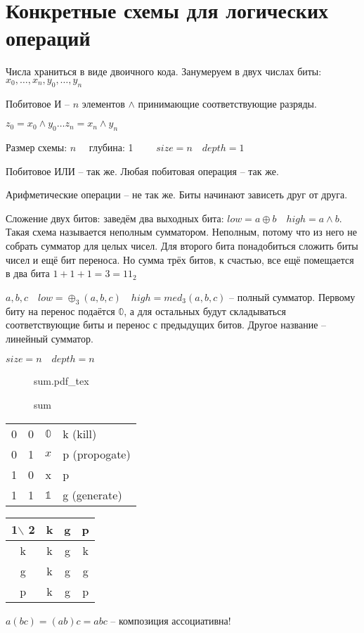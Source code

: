 \documentclass{book}
\theoremstyle{definition}
\newcommand{\incfig}[1]{%
    \def\svgwidth{\columnwidth}
    {#1.pdf_tex}
}
\begin{document}
\section{Конкретные схемы для логических операций}

Числа храниться в виде двоичного кода. Занумеруем в двух числах биты: $x_0, \ldots, x_{n}, y_0, \ldots, y_{n} $

Побитовое И -- $n$ элементов  $\land$ принимающие соответствующие разряды.

$z_0 = x_0\land y_0 \ldots z_n = x_{n} \land y_{n} $

Размер схемы: $n\quad $ глубина: 1  $\qquad size=n\quad depth=1$

Побитовое ИЛИ -- так же. Любая побитовая операция -- так же.

Арифметические операции -- не так же. Биты начинают зависеть друг от друга.

Сложение двух битов: заведём два выходных бита:  $low = a\oplus b\quad high = a\land b$. Такая схема называется неполным сумматором. Неполным, потому что из него не собрать сумматор для целых чисел. Для второго бита понадобиться сложить биты чисел и ещё бит переноса. Но сумма трёх битов, к счастью, все ещё помещается в два бита $1+1+1=3 = 11_2$

$a,b,c\quad low = \oplus_3\left( a, b, c \right)\quad high = med_3\left( a, b, c \right)  $ -- полный сумматор. Первому биту на перенос подаётся $\mathbb{0}$, а для остальных будут складываться соответствующие биты и перенос с предыдущих битов. Другое название -- линейный сумматор.

$size=n\quad depth = n$

\begin{figure}[ht]
    \centering
    \incfig{sum}
    \caption{sum}
    \label{fig:sum}
\end{figure}

\begin{tabular}{cc|cl}
    0&0& $\mathbb{0}$ &k (kill)\\
    0&1& $x$ & p (propogate)\\
    1&0& x & p\\
    1&1& $\mathbb{1}$ &g (generate)
    
\end{tabular}

\begin{tabular}{c|ccc}
    1$\backslash$ 2&k&g&p\\ \hline
    k&k&g&k\\
    g&k&g&g\\
    p&k&g&p\\
\end{tabular}
$a(bc) = (ab)c = abc$ -- композиция ассоциативна!
\end{document}
